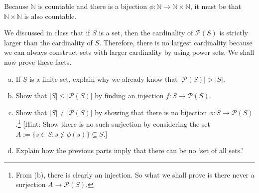 \documentclass[11pt,letterpaper]{article}
\begin{document}
Because $\mathbb{N}$ is countable and there is a bijection $\phi: \mathbb{N} \to \mathbb{N} \times \mathbb{N}$, it must be that $\mathbb{N} \times \mathbb{N}$ is also countable. 



\newpage



 We discussed in class that if $S$ is a set, then the cardinality of $\mathcal{P}(S)$ is strictly larger than the cardinality of $S$. Therefore, there is no largest cardinality because we can always construct sets with larger cardinality by using power sets. We shall now prove these facts. 
        \begin{enumerate}[(a)]
        \item If $S$ is a finite set, explain why we already know that $|\mathcal{P}(S)| > |S|$. 
        \item Show that $|S| \leq |\mathcal{P}(S)|$ by finding an injection $f: S \to \mathcal{P}(S)$. 
        \item Show that $|S| \neq |\mathcal{P}(S)|$ by showing that there is no bijection $\phi: S \to \mathcal{P}(S)$.\footnote{From (b), there is clearly an injection. So what we shall prove is there never a surjection $A \to \mathcal{P}(S)$.} [Hint: Show there is no such surjection by considering the set $A:= \{ s \in S \colon s \notin \phi(s) \} \subseteq S$.]
        \item Explain how the previous parts imply that there can be no `set of all sets.'        
        \end{enumerate} \pspace
\end{document}
